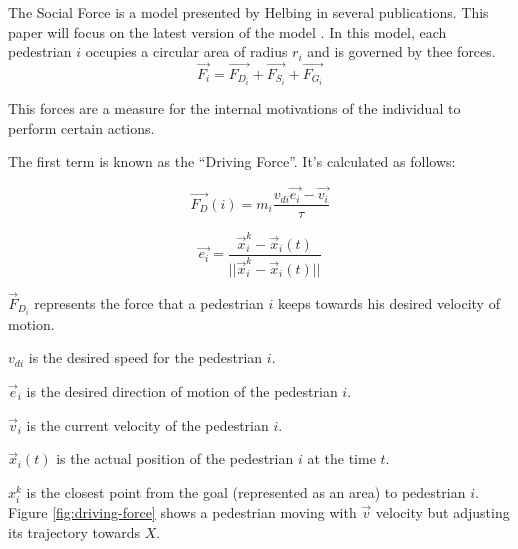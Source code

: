 \documentclass[draftclsnofoot]{IEEEtran}
\begin{document}
The Social Force is a model presented by Helbing \cite{key-helb1995,key-helb2000}
in several publications. This paper will focus on the latest version
of the model \cite{key-helb2000}. In this model, each pedestrian $i$ occupies
a circular area of radius $r_{i}$ and is governed by thee forces.
\[
\vec{F_{i}}=\vec{F_{D_{i}}}+\vec{F_{S_{i}}}+\vec{F_{G_{i}}}
\]


This forces are a measure for the internal motivations of the individual
to perform certain actions.

The first term is known as the ``Driving Force''. It's calculated
as follows:

\begin{equation}
\vec{F_{D}}(i)=m_{i}\frac{v_{di}\vec{e_{i}}-\vec{v_{i}}}{\tau}\label{eq:driving-force}
\end{equation}


\begin{equation}
\vec{e_{i}}=\frac{\vec{x}_{i}^{k}-\vec{x}_{i}(t)}{||\vec{x}_{i}^{k}-\vec{x}_{i}(t)||}\label{eq:desired-direction}
\end{equation}


$\vec{F}_{D_{i}}$ represents the force that a pedestrian $i$ keeps
towards his desired velocity of motion.

$v_{di}$ is the desired speed for the pedestrian $i$.

$\vec{e}{}_{i}$ is the desired direction of motion of the pedestrian
$i$.

$\vec{v}{}_{i}$ is the current velocity of the pedestrian $i$.

$\vec{x}_{i}(t)$ is the actual position of the pedestrian $i$ at
the time $t$.

$x_{i}^{k}$ is the closest point from the goal (represented as an
area) to pedestrian $i$. \\


Figure \ref{fig:driving-force} shows a pedestrian moving with $\vec{v}$ velocity but adjusting its trajectory towards
\textbf{$X$}.
\end{document}
